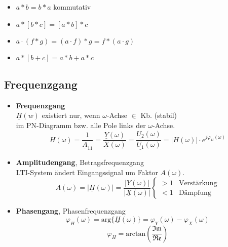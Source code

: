 \begin{mdframed}[style=exercise,frametitle=Rechenregeln]
  \begin{itemize}
	\item {$a*b=b*a$} {\small \qquad kommutativ}
	\item $a*[b*c]=[a*b]*c$
	\item $a\cdot(f*g)=(a\cdot f) * g = f * (a\cdot g)$
	\item $a*[b+c]=a*b+a*c$
  \end{itemize}
\end{mdframed}
\clearpage
\subsection{Frequenzgang}
  \begin{itemize}
      \item{\textbf{Frequenzgang}}\\
      \small{$\underline{H}(w)$ existiert nur, wenn $\omega$-Achse $\in$ Kb. (stabil)\\ im PN-Diagramm bzw. alle Pole links der $\omega$-Achse.}
          \[
              \underline{H}(\omega) = \frac{1}{\underline{A}_{11}} =
              \frac{\underline{Y}(\omega)}{\underline{X}(\omega)} =
              \frac{\underline{U_2}(\omega)}{\underline{U_1}(\omega)} = |\underline{H}(\omega)|\cdot e^{j\varphi_H(\omega)}
          \]
      \item{\textbf{Amplitudengang}}, Betragsfrequenzgang\\
      \small{LTI-System ändert Eingangssignal um Faktor $A(\omega)$}.
          \[
              A(\omega) = |\underline{H}(\omega)| =
              \frac{|\underline{Y}(\omega)|}{|\underline{X}(\omega)|}
              \begin{cases}
                  > 1 & \text{Verst\"arkung}\\
                  < 1 & \text{D\"ampfung}
              \end{cases}
          \]
      \item{\textbf{Phasengang}}, Phasenfrequenzgang\\
          \[
              \varphi_H(\omega) = \text{arg}\{\underline{H}(\omega)\} =
              \varphi_Y(\omega) - \varphi_X(\omega)
          \]
          \[
              \varphi_H = \text{arctan}\left(\frac{\mathfrak{Im}}{\mathfrak{Re}}\right)
          \]
  \end{itemize}
